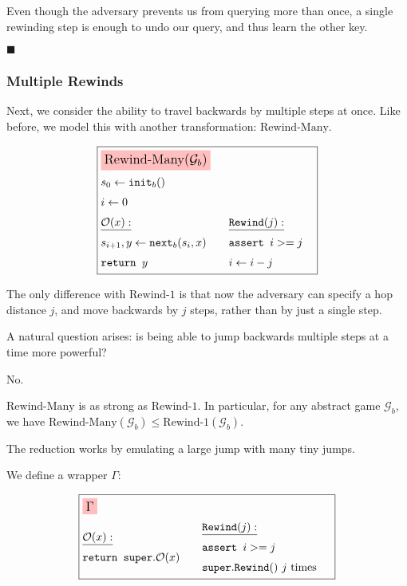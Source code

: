 Even though the adversary prevents us from querying more than once,
a single rewinding step is enough to undo our query, and thus learn
the other key.

$\blacksquare$

\subsubsection{Multiple Rewinds}

Next, we consider the ability to travel backwards by multiple steps
at once.
Like before, we model this with another transformation:
$\text{Rewind-Many}$.

\begin{game}
\captionsetup{justification=centering}
$$
\boxed{
\begin{aligned}
&\colorbox{pink}{\large $\text{Rewind-Many}(\mathcal{G}_b)$}\cr
&s_0 \gets \texttt{init}_b()\cr
&i \gets 0\cr
&\begin{aligned}
    &\underline{\mathcal{O}(x):}\cr
    &s_{i + 1}, y \gets \texttt{next}_b(s_i, x)\cr
    &\texttt{return } y\cr
\end{aligned}
&\begin{aligned}
    &\underline{\texttt{Rewind}(j):}\cr
    &\texttt{assert } i >= j\cr
    &i \gets i - j\cr
\end{aligned}\cr
\end{aligned}
}
$$
\caption{$\text{Rewind-Many}(\mathcal{G}_b)$}
\end{game}

The only difference with $\text{Rewind-1}$ is that now the adversary
can specify a hop distance $j$, and move backwards by $j$ steps,
rather than by just a single step.

A natural question arises: is being able to jump backwards multiple
steps at a time more powerful?

No.

\begin{claim}
    \label{claim:rewind-many-is-not-strong}
    $\text{Rewind-Many}$ is as strong as $\text{Rewind-1}$.
    In particular, for any abstract game $\mathcal{G}_b$, we have
    $\text{Rewind-Many}(\mathcal{G}_b) \leq \text{Rewind-1}(\mathcal{G}_b)$.
\end{claim}

The reduction works by emulating a large jump with many tiny jumps.

We define a wrapper $\Gamma$:

$$
\boxed{
\begin{aligned}
&\colorbox{pink}{\large $\Gamma$}\cr
&\begin{aligned}
    &\underline{\mathcal{O}(x):}\cr
    &\texttt{return } \texttt{super}.\mathcal{O}(x)\cr
\end{aligned}
&\begin{aligned}
    &\underline{\texttt{Rewind}(j):}\cr
    &\texttt{assert } i >= j\cr
    &\texttt{super}.\texttt{Rewind}()\ j \text{ times }\cr
\end{aligned}\cr
\end{aligned}
}
$$


